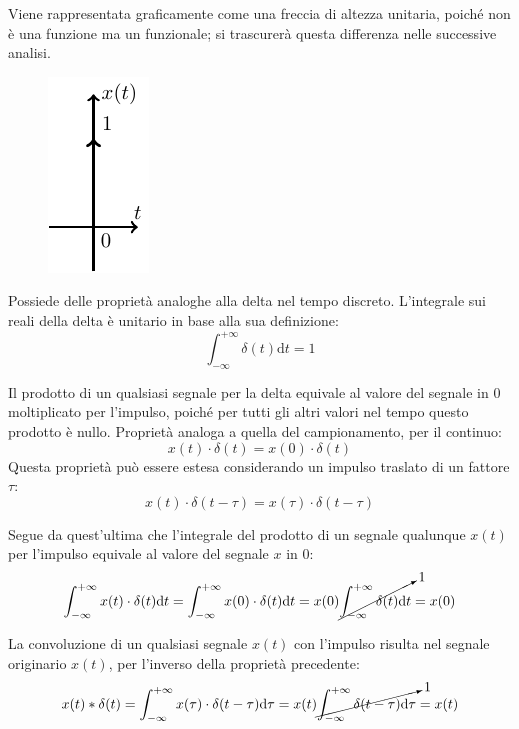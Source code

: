 \documentclass{article}
\newcommand{\df}{\mathrm{d}}
\numberwithin{equation}{subsection}
\begin{document}
Viene rappresentata graficamente come una freccia di altezza unitaria, poiché non è una funzione ma un funzionale; si trascurerà questa differenza nelle successive analisi.  
\begin{figure}[H]%
    \centering
    \includegraphics{impulso.pdf}%
\end{figure}

Possiede delle proprietà analoghe alla delta nel tempo discreto. 
L'integrale sui reali della delta è unitario in base alla sua definizione:
\begin{equation}
    \displaystyle\int_{-\infty}^{+\infty}\delta(t)\df t=1
\end{equation}



Il prodotto di un qualsiasi segnale per la delta equivale al valore del segnale in $0$ moltiplicato per l'impulso, poiché per tutti gli altri valori nel tempo questo prodotto 
è nullo. Proprietà analoga a quella del campionamento, per il continuo:
\begin{equation*}
    x(t)\cdot\delta(t)=x(0)\cdot\delta(t)
\end{equation*}
Questa proprietà può essere estesa considerando un impulso traslato di un fattore $\tau$:
\begin{equation}
    x(t)\cdot\delta(t-\tau)=x(\tau)\cdot\delta(t-\tau)
\end{equation}



Segue da quest'ultima che l'integrale del prodotto di un segnale qualunque $x(t)$ per l'impulso equivale al valore del segnale $x$ in $0$:
\begin{equation*}
    \displaystyle\int_{-\infty}^{+\infty}x(t)\cdot\delta(t)\df t=\int_{-\infty}^{+\infty}x(0)\cdot\delta(t)\df t=x(0)\cancelto{1}{\int_{-\infty}^{+\infty}\delta(t)\df t}=x(0)
\end{equation*}



La convoluzione di un qualsiasi segnale $x(t)$ con l'impulso risulta nel segnale originario $x(t)$, per l'inverso della proprietà precedente: 
\begin{equation}
    x(t)*\delta(t)=\displaystyle\int_{-\infty}^{+\infty}x(\tau)\cdot\delta(t-\tau)\df\tau=x(t)\cancelto{1}{\int_{-\infty}^{+\infty}\delta(t-\tau)\df\tau}=x(t)
\end{equation}
\end{document}

